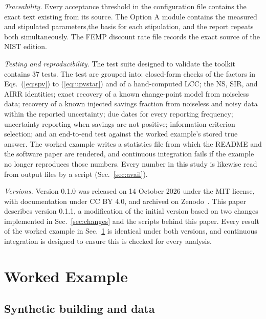 \documentclass[10pt,twocolumn,letterpaper]{article}
\begin{document}
\emph{Traceability.} Every acceptance threshold in the configuration file contains the exact text existing from its source. The Option A module contains the measured and stipulated parameters,the basis for each stipulation, and the report repeats both simultaneously. The FEMP discount rate file records the exact source of the NIST edition.

\emph{Testing and reproducibility.} The test suite designed to validate the toolkit contains 37 tests. The test are grouped into: closed-form checks of the factors in Eqs.~(\ref{eq:spv}) to (\ref{eq:upvstar}) and of a hand-computed LCC; the NS, SIR, and AIRR identities; exact recovery of a known change-point model from noiseless data; recovery of a known injected savings fraction from noiseless and noisy data within the reported uncertainty; due dates for every reporting frequency; uncertainty reporting when savings are not positive; information-criterion selection; and an end-to-end test against the worked example's stored true answer. The worked example writes a statistics file from which the README and the software paper are rendered, and continuous integration fails if the example no longer reproduces those numbers. Every number in this study is likewise read from output files by a script (Sec.~\ref{sec:avail}).

\emph{Versions.} Version 0.1.0 was released on 14 October 2026 under the MIT license, with documentation under CC BY 4.0, and archived on Zenodo~\cite{munilcc}. This paper describes version 0.1.1, a modification of the initial version based on two changes implemented in Sec.~\ref{sec:changes} and the scripts behind this paper. Every result of the worked example in Sec.~\ref{sec:example} is identical under both versions, and continuous integration is designed to ensure this is checked for every analysis.

\section{Worked Example}\label{sec:example}

\subsection{Synthetic building and data}
\end{document}
